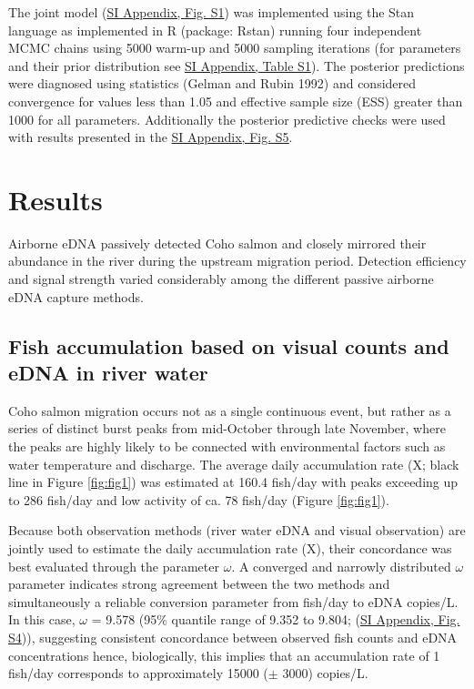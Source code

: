 \documentclass{article}
\begin{document}
The joint model (\href{SI_Appendix.pdf}{SI Appendix, Fig. S1}) was implemented using the Stan language as implemented in R (package: Rstan) running four independent MCMC chains using 5000 warm-up and 5000 sampling iterations (for parameters and their prior distribution see \href{SI_Appendix.pdf}{SI Appendix, Table S1}). The posterior predictions were diagnosed using statistics (Gelman and Rubin 1992) and considered convergence for values less than 1.05 and effective sample size (ESS) greater than 1000 for all parameters. Additionally the posterior predictive checks were used with results presented in the \href{SI_Appendix.pdf}{SI Appendix, Fig. S5}.

\section{Results}

Airborne eDNA passively detected Coho salmon and closely mirrored their abundance  in the river during the upstream migration period. Detection efficiency and signal strength varied considerably among the different passive airborne eDNA capture methods. 

\subsection{Fish accumulation based on visual counts and eDNA in river water}
Coho salmon migration occurs not as a single continuous event, but rather as a series of distinct burst peaks from mid-October through late November, where the peaks are highly likely to be connected with environmental factors such as water temperature and discharge. The average daily accumulation rate (X; black line in Figure \ref{fig:fig1}) was estimated at 160.4 fish/day with peaks exceeding up to 286 fish/day and low activity of ca. 78 fish/day (Figure \ref{fig:fig1}).

Because both observation methods (river water eDNA and visual observation) are jointly used to estimate the daily accumulation rate (X), their concordance was best evaluated through the parameter $\omega$. A converged and narrowly distributed $\omega$ parameter indicates strong agreement between the two methods and simultaneously a reliable conversion parameter from fish/day to eDNA copies/L. In this case, $\omega$ = 9.578 (95\% quantile range of 9.352 to 9.804; (\href{SI_Appendix.pdf}{SI Appendix, Fig. S4})), suggesting consistent concordance between observed fish counts and eDNA concentrations hence, biologically, this implies that an accumulation rate of 1 fish/day corresponds to approximately 15000 ($\pm$ 3000) copies/L.
\end{document}
